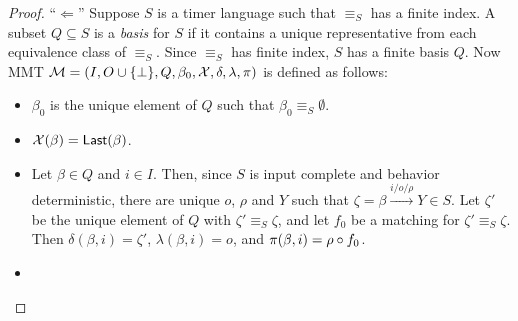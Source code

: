 \begin{proof}
``$\Leftarrow$'' 
Suppose $S$ is a timer language such that $\equiv_S$ has a finite index.
A subset $Q \subseteq S$ is a \emph{basis} for $S$ if it contains a unique representative from
each equivalence class of $\equiv_S$.
%
Since $\equiv_S$ has finite index, $S$ has a finite basis $Q$.
Now MMT ${\mathcal M} = (I, O \cup \{ \perp \}, Q, \beta_0, \mathcal{X}, \delta, \lambda, \pi)$ is defined as follows:
\begin{itemize}
\item
$\beta_0$ is the unique element of $Q$ such that $\beta_0 \equiv_S \emptyset$.
\item
$\mathcal{X}(\beta) = \mathsf{Last}({\beta})$.
\item
Let $\beta \in Q$ and $i \in I$. Then, since $S$ is input complete and behavior deterministic, there are unique
$o$, $\rho$ and $Y$ such that $\zeta = \beta \xrightarrow{i/o/\rho} Y \in S$.
Let $\zeta'$ be the unique element of $Q$ with $\zeta' \equiv_S \zeta$, and
let $f_0$ be a matching for $\zeta' \equiv_S \zeta$.
Then $\delta(\beta,i) = \zeta'$, $\lambda(\beta,i) = o$, and $\pi(\beta,i) = \rho  \circ f_0$.
\item

\end{itemize}
\end{proof}
